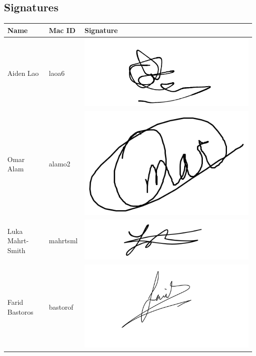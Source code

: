 \documentclass{article}
\begin{document}
\subsection{Signatures}
\begin{center}
	\renewcommand{\arraystretch}{1.5} %
	\begin{tabular}{|m{4cm}|m{4cm}|m{6cm}|} %
		\hline
		\textbf{Name} & \textbf{Mac ID} & \textbf{Signature} \\
		\hline
		Aiden Lao & laoa6 & \includegraphics[scale=0.08]{aidan-signature.png} \\ 
		\hline
		Omar Alam & alamo2 & \includegraphics[scale=0.3]{omar-signature.png} \\ 
		\hline
		Luka Mahrt-Smith & mahrtsml & \includegraphics[scale=0.1]{luka_signature.png}\\ 
		\hline
		Farid Bastoros & bastorof & \includegraphics[scale=0.06]{Farid Bastoros - Signature.jpeg}\\ 

\end{tabular}
\end{center}
\end{document}
